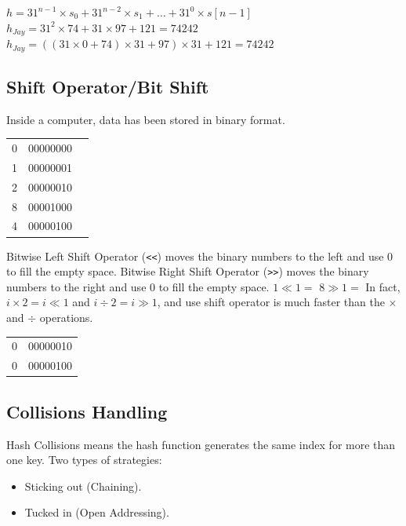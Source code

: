 $h=31^{n-1} \times s_0 + 31^{n-2} \times s_1 + \dots + 31^0 \times s[n-1]$ \\
$h_{Jay}=31^2 \times 74 + 31 \times 97 + 121=74242$ \\
$h_{Jay}=((31 \times 0 + 74 )\times 31 + 97 )\times 31 + 121=74242$ \\

\subsection*{Shift Operator/Bit Shift}
Inside a computer, data has been stored in binary format.
\begin{tabular}{|l|l|l|}
\hline
0 & 00000000 & \\
1 & 00000001 & \\
2 & 00000010 & \\
8 & 00001000 & \\
4 & 00000100 & \\
\hline
\end{tabular}
Bitwise Left Shift Operator (\texttt{<<}) moves the binary numbers to the left and use 0 to fill the empty space.
Bitwise Right Shift Operator (\texttt{>>}) moves the binary numbers to the right and use 0 to fill the empty space.
$1 \ll 1 =$
$8 \gg 1 =$
In fact, $i \times 2 = i \ll 1$ and $i \div 2 = i \gg 1$, and use shift operator is much faster than the $\times$ and $\div$ operations.
\begin{tabular}{|l|l|}
\hline
0 & 00000010 \\
0 & 00000100 \\
\hline
\end{tabular}

\subsection{Collisions Handling}
Hash Collisions means the hash function generates the same index for more than one key.
Two types of strategies:
\begin{itemize}
    \item Sticking out (Chaining).
    \item Tucked in (Open Addressing).
\end{itemize}

